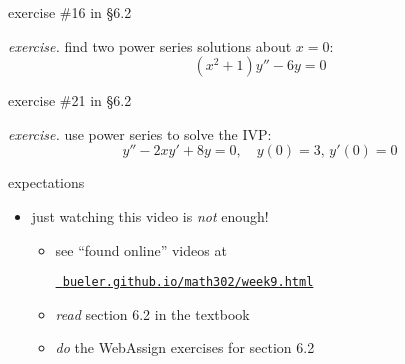\documentclass[urlcolor=blue,dvipsnames]{beamer}
\begin{document}
\begin{frame}{exercise \#16 in \S 6.2}

\noindent \emph{exercise.}  find two power series solutions about $x=0$:
    $$(x^2+1) y'' - 6 y = 0$$

\vspace{50mm}
\end{frame}


\begin{frame}{exercise \#21 in \S 6.2}

\noindent \emph{exercise.}  use power series to solve the IVP:
    $$y'' - 2 x y' + 8 y = 0, \quad y(0)=3, \, y'(0)=0$$

\vspace{50mm}
\end{frame}


\begin{frame}{expectations}

\begin{itemize}
\item just watching this video is \emph{not} enough!
     \begin{itemize}
     \item see ``found online'' videos at

     \centerline{\href{https://bueler.github.io/math302/week9.html}{\tt \color{cyan} bueler.github.io/math302/week9.html}}
     \item \emph{read} section 6.2 in the textbook
     \item \emph{do} the WebAssign exercises for section 6.2
     \end{itemize}
\end{itemize}
\end{frame}
\end{document}
